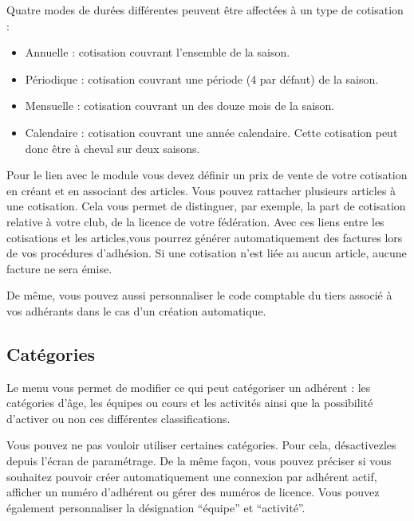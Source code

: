 \documentclass[a4paper,10pt,oneside,french]{sphinxmanual}
\begin{document}
\sphinxAtStartPar
Quatre modes de durées différentes peuvent être affectées à un type de cotisation :
\begin{itemize}
\item {} 
\sphinxAtStartPar
Annuelle : cotisation couvrant l’ensemble de la saison.

\item {} 
\sphinxAtStartPar
Périodique : cotisation couvrant une période (4 par défaut) de la saison.

\item {} 
\sphinxAtStartPar
Mensuelle : cotisation couvrant un des douze mois de la saison.

\item {} 
\sphinxAtStartPar
Calendaire : cotisation couvrant une année calendaire. Cette cotisation peut donc être à cheval sur deux saisons.

\end{itemize}

\sphinxAtStartPar
Pour le lien avec le module  vous devez définir un prix de vente de votre cotisation en créant et en associant des articles.
Vous pouvez rattacher plusieurs articles à  une cotisation. Cela vous permet de distinguer, par exemple, la part de cotisation relative à votre club, de la licence de votre fédération.
Avec ces liens entre les cotisations et les articles,vous pourrez générer automatiquement des factures lors de vos procédures d’adhésion. Si une cotisation n’est liée au aucun article, aucune facture ne sera émise.

\sphinxAtStartPar
De même, vous pouvez aussi personnaliser le code comptable du tiers associé à vos adhérants dans le cas d’un création automatique.


\subsection{Catégories}
\label{\detokenize{member/config:categories}}
\sphinxAtStartPar
Le menu  vous permet de modifier ce qui peut catégoriser un adhérent : les catégories d’âge, les équipes ou cours et les activités ainsi que la possibilité d’activer ou non ces différentes classifications.

\sphinxAtStartPar
Vous pouvez ne pas vouloir utiliser certaines catégories. Pour cela, désactivez\sphinxhyphen{}les depuis l’écran de paramétrage.
De la même façon, vous pouvez préciser si vous souhaitez pouvoir créer automatiquement une connexion par adhérent actif, afficher un numéro d’adhérent ou gérer des numéros de licence.
Vous pouvez également personnaliser la désignation “équipe” et “activité”.
\begin{quote}

\noindent{}
\end{quote}
\end{document}
